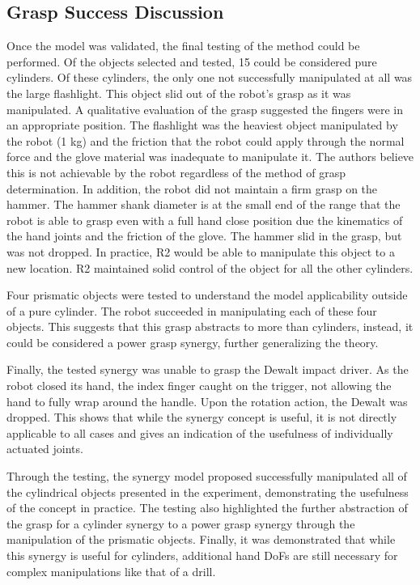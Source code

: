 \documentclass[runningheads,a4paper]{llncs}
\begin{document}
\subsection{Grasp Success Discussion}
Once the model was validated, the final testing of the method could be performed. Of the objects selected and tested, 15 could be considered pure cylinders. Of these cylinders, the only one not successfully manipulated at all was the large flashlight. This object slid out of the robot's grasp as it was manipulated. A qualitative evaluation of the grasp suggested the fingers were in an appropriate position. The flashlight was the heaviest object manipulated by the robot (1 kg) and the friction that the robot could apply through the normal force and the glove material was inadequate to manipulate it. The authors believe this is not achievable by the robot regardless of the method of grasp determination. In addition, the robot did not maintain a firm grasp on the hammer. The hammer shank diameter is at the small end of the range that the robot is able to grasp even with a full hand close position due the kinematics of the hand joints and the friction of the glove. The hammer slid in the grasp, but was not dropped. In practice, R2 would be able to manipulate this object to a new location. R2 maintained solid control of the object for all the other cylinders. 

Four prismatic objects were tested to understand the model applicability outside of a pure cylinder. The robot succeeded in manipulating each of these four objects. This suggests that this grasp abstracts to more than cylinders, instead, it could be considered a power grasp synergy, further generalizing the theory. 

Finally, the tested synergy was unable to grasp the Dewalt impact driver. As the robot closed its hand, the index finger caught on the trigger, not allowing the hand to fully wrap around the handle. Upon the rotation action, the Dewalt was dropped. This shows that while the synergy concept is useful, it is not directly applicable to all cases and gives an indication of the usefulness of individually actuated joints. 

Through the testing, the synergy model proposed successfully manipulated all of the cylindrical objects presented in the experiment, demonstrating the usefulness of the concept in practice. The testing also highlighted the further abstraction of the grasp for a cylinder synergy to a power grasp synergy through the manipulation of the prismatic objects. Finally, it was demonstrated that while this synergy is useful for cylinders, additional hand DoFs are still necessary for complex manipulations like that of a drill.
\end{document}
